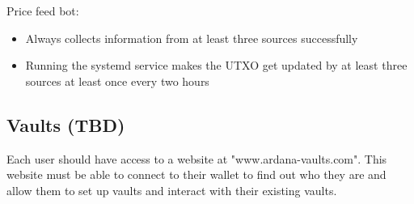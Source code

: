 \documentclass{article} %
\begin{document}
Price feed bot:
\begin{itemize}
  \item Always collects information from at least three sources successfully
  \item Running the systemd service makes the UTXO get updated by at least three
    sources at least once every two hours
\end{itemize}

% 
% 
% 
% 
\subsection{Vaults (TBD)}

Each user should have access to a website at "www.ardana-vaults.com". This
website must be able to connect to their wallet to find out who they are and
allow them to set up vaults and interact with their existing vaults. \\
\end{document}
